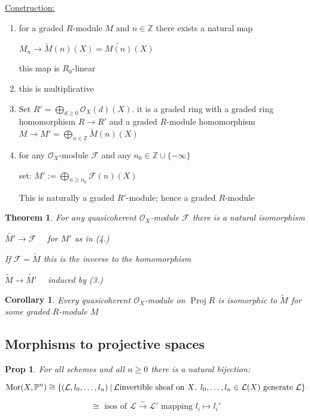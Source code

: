 \documentclass[a4paper, 12pt]{article}
\newcommand{\ca}[1]{\mathcal{#1}}
\newcommand{\caf}{\mathcal{F}}
\newcommand{\oxmod}{$\mathcal{O}_X$-module }
\newcommand{\ox}{\mathcal{O}_X}
\newtheorem*{prop}{Prop}
\newtheorem*{thm}{Theorem}
\newtheorem*{cor}{Corollary}
\DeclareMathOperator{\mor}{Mor}
\DeclareMathOperator{\proj}{Proj}
\begin{document}
	\underline{Construction:}
	
	\begin{enumerate}
		\item for a graded $ R $-module $ M $ and $ n \in \mathbb{Z} $ there exists a natural map 
		
		$ M_n \longrightarrow \tilde{M}(n)(X) = \widetilde {M(n)}(X) $
		
		this map is $ R_0 $-linear
		\item this is multiplicative
		\item Set $ R' = \bigoplus_{d \geq 0} \ox(d)(X) $. it is a graded ring with a graded ring homomorphism $  R \rightarrow R' $ and a graded $ R $-module homomorphism $ M \rightarrow M'= \bigoplus_{n\in \mathbb{Z}} \widetilde{M}(n)(X) $
		\item for any \oxmod $ \caf $ and any $ n_0 \in \mathbb{Z} \cup \{ -\infty \} $ 
		
		set: $ M' := \bigoplus_{n \geq n_0} \caf(n)(X) $
		
		This is naturally a graded $ R' $-module; hence a graded $ R $-module
	\end{enumerate}
	
	
	\begin{thm}
		For any quasicoherent \oxmod $ \caf $  there is a natural isomorphism 
		
		$ \widetilde{M'} \longrightarrow \caf \quad $ for $ M' $ as in (4.) 
		
		If $ \caf = \widetilde{M} $ this is the inverse to the homomorphism 
		
		$ \widetilde{M} \longrightarrow \widetilde{M'} \quad $ induced by (3.)
		
	\end{thm}
	
	
	\begin{cor}
		Every quasicoherent \oxmod on $ \proj R $ is isomorphic to $ \widetilde{M} $  for some graded $ R $-module $ M $
	\end{cor}
	
	
	
	\subsection{Morphisms to projective spaces}
	
	\begin{prop}
		For all schemes and all $ n \geq 0 $ there is a natural bijection:
		
		\[ \mor(X, \mathbb{P}^n) \cong \{ (\ca{L},l_0,\dots,l_n) \: | \: \ca{L} \text{invertible sheaf on $ X $. $ l_0,\dots , l_n \in \ca{L}(X) $ generate } \ca{L} \} \]
		
		\[ \cong \text{ isos of } \ca{L} \xrightarrow{\sim} \ca{L'} \text{ mapping } l_i \mapsto l_i' \]
		
	\end{prop}
	
\end{document}
